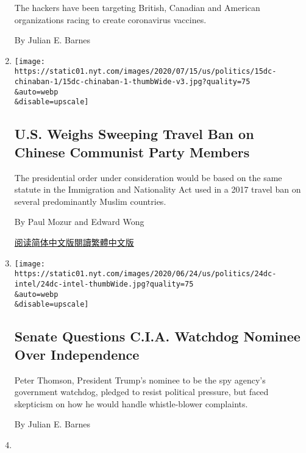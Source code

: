 \begin{enumerate}
  The hackers have been targeting British, Canadian and American
  organizations racing to create coronavirus vaccines.

  By Julian E. Barnes
\item
  \href{/2020/07/15/us/politics/china-travel-ban.html}{}

  \texttt{[image: https://static01.nyt.com/images/2020/07/15/us/politics/15dc-chinaban-1/15dc-chinaban-1-thumbWide-v3.jpg?quality=75\\\&auto=webp\\\&disable=upscale]}

  \hypertarget{us-weighs-sweeping-travel-ban-on-chinese-communist-party-members}{%
  \subsection{U.S. Weighs Sweeping Travel Ban on Chinese Communist Party
  Members}\label{us-weighs-sweeping-travel-ban-on-chinese-communist-party-members}}

  The presidential order under consideration would be based on the same
  statute in the Immigration and Nationality Act used in a 2017 travel
  ban on several predominantly Muslim countries.

  By Paul Mozur and Edward Wong

  \href{https://cn.nytimes.com/usa/20200716/china-travel-ban/}{阅读简体中文版}\href{https://cn.nytimes.com/usa/20200716/china-travel-ban/zh-hant/}{閱讀繁體中文版}
\item
  \href{/2020/06/24/us/politics/cia-watchdog-peter-thomson.html}{}

  \texttt{[image: https://static01.nyt.com/images/2020/06/24/us/politics/24dc-intel/24dc-intel-thumbWide.jpg?quality=75\\\&auto=webp\\\&disable=upscale]}

  \hypertarget{senate-questions-cia-watchdog-nominee-over-independence}{%
  \subsection{Senate Questions C.I.A. Watchdog Nominee Over
  Independence}\label{senate-questions-cia-watchdog-nominee-over-independence}}

  Peter Thomson, President Trump's nominee to be the spy agency's
  government watchdog, pledged to resist political pressure, but faced
  skepticism on how he would handle whistle-blower complaints.

  By Julian E. Barnes
\item
  \href{/2020/06/22/us/politics/cia-recruiting-ad.html}{}


\end{enumerate}
